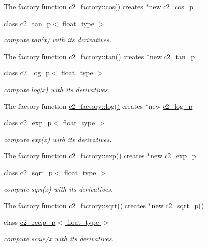 \begin{DoxyCompactItemize}
\begin{DoxyCompactList}
The factory function \hyperlink{classc2__factory_abc5ea51417ecef590629a39f7a2227e4}{c2\-\_\-factory\-::cos()} creates $\ast$new \hyperlink{classc2__cos__p}{c2\-\_\-cos\-\_\-p} \end{DoxyCompactList}\item 
class \hyperlink{classc2__tan__p}{c2\-\_\-tan\-\_\-p$<$ float\-\_\-type $>$}
\begin{DoxyCompactList}\small\item\em compute tan(x) with its derivatives.

The factory function \hyperlink{classc2__factory_a2f83cbd3be646166f7e3bef1e27244b9}{c2\-\_\-factory\-::tan()} creates $\ast$new \hyperlink{classc2__tan__p}{c2\-\_\-tan\-\_\-p} \end{DoxyCompactList}\item 
class \hyperlink{classc2__log__p}{c2\-\_\-log\-\_\-p$<$ float\-\_\-type $>$}
\begin{DoxyCompactList}\small\item\em compute log(x) with its derivatives.

The factory function \hyperlink{classc2__factory_af20c7c4fee421c8ee0b51bac1c42302e}{c2\-\_\-factory\-::log()} creates $\ast$new \hyperlink{classc2__log__p}{c2\-\_\-log\-\_\-p} \end{DoxyCompactList}\item 
class \hyperlink{classc2__exp__p}{c2\-\_\-exp\-\_\-p$<$ float\-\_\-type $>$}
\begin{DoxyCompactList}\small\item\em compute exp(x) with its derivatives.

The factory function \hyperlink{classc2__factory_ad6c29a455b386c1971e6614f6962f3da}{c2\-\_\-factory\-::exp()} creates $\ast$new \hyperlink{classc2__exp__p}{c2\-\_\-exp\-\_\-p} \end{DoxyCompactList}\item 
class \hyperlink{classc2__sqrt__p}{c2\-\_\-sqrt\-\_\-p$<$ float\-\_\-type $>$}
\begin{DoxyCompactList}\small\item\em compute sqrt(x) with its derivatives.

The factory function \hyperlink{classc2__factory_a5b189f66ec65267f3812cdc45ccf072d}{c2\-\_\-factory\-::sqrt()} creates $\ast$new \hyperlink{classc2__sqrt__p_a780a0f48a8fb428b2cb9fac74b7b56e7}{c2\-\_\-sqrt\-\_\-p()} \end{DoxyCompactList}\item 
class \hyperlink{classc2__recip__p}{c2\-\_\-recip\-\_\-p$<$ float\-\_\-type $>$}
\begin{DoxyCompactList}\small\item\em compute scale/x with its derivatives.


\end{DoxyCompactList}
\end{DoxyCompactItemize}
